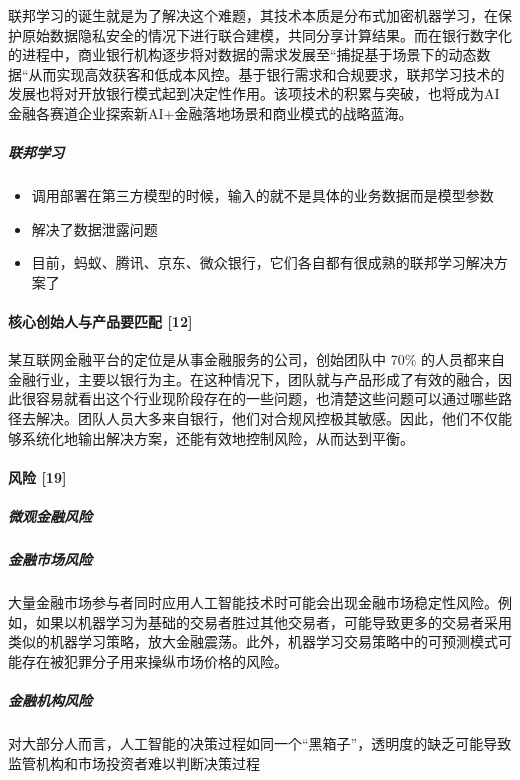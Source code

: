 \documentclass[letterpaper,10pt,english]{sphinxmanual}
\begin{document}
联邦学习的诞生就是为了解决这个难题，其技术本质是分布式加密机器学习，在保护原始数据隐私安全的情况下进行联合建模，共同分享计算结果。而在银行数字化的进程中，商业银行机构逐步将对数据的需求发展至“捕捉基于场景下的动态数据“从而实现高效获客和低成本风控。基于银行需求和合规要求，联邦学习技术的发展也将对开放银行模式起到决定性作用。该项技术的积累与突破，也将成为AI金融各赛道企业探索新AI+金融落地场景和商业模式的战略蓝海。


\subparagraph{联邦学习}
\label{\detokenize{chapter_project/AI_Finance:id16}}\begin{itemize}
\item {} 
调用部署在第三方模型的时候，输入的就不是具体的业务数据而是模型参数

\item {} 
解决了数据泄露问题

\item {} 
目前，蚂蚁、腾讯、京东、微众银行，它们各自都有很成熟的联邦学习解决方案了

\end{itemize}


\paragraph{核心创始人与产品要匹配 {[}12{]}}
\label{\detokenize{chapter_project/AI_Finance:id17}}
某互联网金融平台的定位是从事金融服务的公司，创始团队中 70\%
的人员都来自金融行业，主要以银行为主。在这种情况下，团队就与产品形成了有效的融合，因此很容易就看出这个行业现阶段存在的一些问题，也清楚这些问题可以通过哪些路径去解决。团队人员大多来自银行，他们对合规风控极其敏感。因此，他们不仅能够系统化地输出解决方案，还能有效地控制风险，从而达到平衡。


\paragraph{风险 {[}19{]}}
\label{\detokenize{chapter_project/AI_Finance:id18}}

\subparagraph{微观金融风险}
\label{\detokenize{chapter_project/AI_Finance:id19}}

\subparagraph{金融市场风险}
\label{\detokenize{chapter_project/AI_Finance:id20}}
大量金融市场参与者同时应用人工智能技术时可能会出现金融市场稳定性风险。例如，如果以机器学习为基础的交易者胜过其他交易者，可能导致更多的交易者采用类似的机器学习策略，放大金融震荡。此外，机器学习交易策略中的可预测模式可能存在被犯罪分子用来操纵市场价格的风险。


\subparagraph{金融机构风险}
\label{\detokenize{chapter_project/AI_Finance:id21}}
对大部分人而言，人工智能的决策过程如同一个“黑箱子”，透明度的缺乏可能导致监管机构和市场投资者难以判断决策过程
\end{document}
